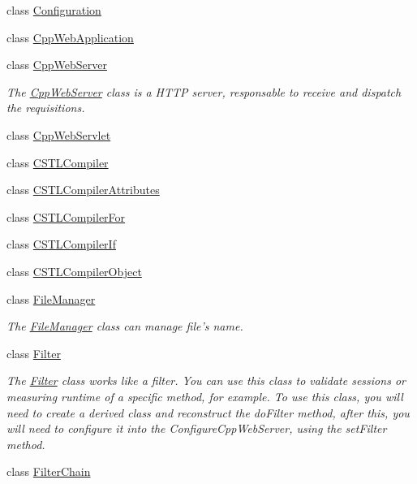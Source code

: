\begin{DoxyCompactItemize}
\item 
class \hyperlink{class_c_w_f_1_1_configuration}{Configuration}
\item 
class \hyperlink{class_c_w_f_1_1_cpp_web_application}{Cpp\+Web\+Application}
\item 
class \hyperlink{class_c_w_f_1_1_cpp_web_server}{Cpp\+Web\+Server}
\begin{DoxyCompactList}\small\item\em The \hyperlink{class_c_w_f_1_1_cpp_web_server}{Cpp\+Web\+Server} class is a H\+T\+T\+P server, responsable to receive and dispatch the requisitions. \end{DoxyCompactList}\item 
class \hyperlink{class_c_w_f_1_1_cpp_web_servlet}{Cpp\+Web\+Servlet}
\item 
class \hyperlink{class_c_w_f_1_1_c_s_t_l_compiler}{C\+S\+T\+L\+Compiler}
\item 
class \hyperlink{class_c_w_f_1_1_c_s_t_l_compiler_attributes}{C\+S\+T\+L\+Compiler\+Attributes}
\item 
class \hyperlink{class_c_w_f_1_1_c_s_t_l_compiler_for}{C\+S\+T\+L\+Compiler\+For}
\item 
class \hyperlink{class_c_w_f_1_1_c_s_t_l_compiler_if}{C\+S\+T\+L\+Compiler\+If}
\item 
class \hyperlink{class_c_w_f_1_1_c_s_t_l_compiler_object}{C\+S\+T\+L\+Compiler\+Object}
\item 
class \hyperlink{class_c_w_f_1_1_file_manager}{File\+Manager}
\begin{DoxyCompactList}\small\item\em The \hyperlink{class_c_w_f_1_1_file_manager}{File\+Manager} class can manage file's name. \end{DoxyCompactList}\item 
class \hyperlink{class_c_w_f_1_1_filter}{Filter}
\begin{DoxyCompactList}\small\item\em The \hyperlink{class_c_w_f_1_1_filter}{Filter} class works like a filter. You can use this class to validate sessions or measuring runtime of a specific method, for example. To use this class, you will need to create a derived class and reconstruct the do\+Filter method, after this, you will need to configure it into the Configure\+Cpp\+Web\+Server, using the set\+Filter method. \end{DoxyCompactList}\item 
class \hyperlink{class_c_w_f_1_1_filter_chain}{Filter\+Chain}

\end{DoxyCompactItemize}
